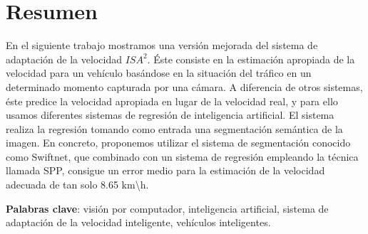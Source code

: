 \chapter{Resumen}


En el siguiente trabajo mostramos una versión mejorada del sistema de adaptación de la velocidad $ISA^{2}$. Éste consiste en la estimación apropiada de la velocidad para un vehículo basándose en la situación del tráfico en un determinado momento capturada por una cámara. A diferencia de otros sistemas, éste predice la velocidad apropiada en lugar de la velocidad real, y para ello usamos diferentes sistemas de regresión de inteligencia artificial. El sistema realiza la regresión tomando como entrada una segmentación semántica de la imagen. En concreto, proponemos utilizar el sistema de segmentación conocido como Swiftnet, que combinado con un sistema de regresión empleando la técnica llamada \ac{SPP}, consigue un error medio para la estimación de la velocidad adecuada de tan solo 8.65 km\textbackslash{h}.


\vspace{0.5cm}

\textbf{Palabras clave}: visión por computador, inteligencia artificial, sistema de adaptación de la velocidad inteligente, vehículos inteligentes.

\newpage
\thispagestyle{empty}
\hspace*{0.5cm}
\newpage

